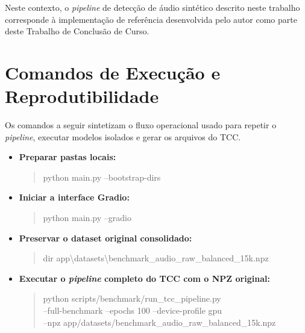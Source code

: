 \documentclass[12pt,a4paper]{article}
\begin{document}
Neste contexto, o \textit{pipeline} de detecção de áudio sintético descrito
neste trabalho corresponde à implementação de referência desenvolvida pelo
autor como parte deste Trabalho de Conclusão de Curso.

\section{Comandos de Execução e Reprodutibilidade}

Os comandos a seguir sintetizam o fluxo operacional usado para repetir o
\textit{pipeline}, executar modelos isolados e gerar os arquivos do TCC.

\begin{itemize}
    \item \textbf{Preparar pastas locais:}
    \begin{quote}\footnotesize\ttfamily
    python main.py --bootstrap-dirs
    \end{quote}

    \item \textbf{Iniciar a interface Gradio:}
    \begin{quote}\footnotesize\ttfamily
    python main.py --gradio
    \end{quote}

    \item \textbf{Preservar o dataset original consolidado:}
    \begin{quote}\footnotesize\ttfamily
    dir app\textbackslash datasets\textbackslash benchmark\_audio\_raw\_balanced\_15k.npz
    \end{quote}

    \item \textbf{Executar o \textit{pipeline} completo do TCC com o NPZ original:}
    \begin{quote}\footnotesize\ttfamily
    python scripts/benchmark/run\_tcc\_pipeline.py\\
    --full-benchmark --epochs 100 --device-profile gpu\\
    --npz app/datasets/benchmark\_audio\_raw\_balanced\_15k.npz
    \end{quote}


\end{itemize}
\end{document}

